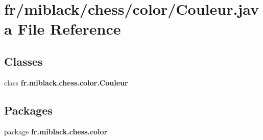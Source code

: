 \section{fr/miblack/chess/color/\-Couleur.java File Reference}
\label{Couleur_8java}
\subsection*{Classes}
\begin{DoxyCompactItemize}
\item 
class {\bf fr.\-miblack.\-chess.\-color.\-Couleur}
\end{DoxyCompactItemize}
\subsection*{Packages}
\begin{DoxyCompactItemize}
\item 
package {\bf fr.\-miblack.\-chess.\-color}
\end{DoxyCompactItemize}
